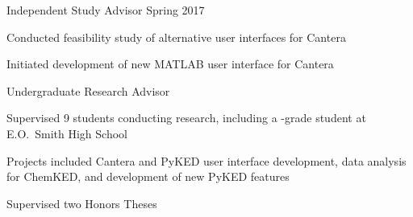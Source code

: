 \begin{outerlist}
    \item Independent Study Advisor \hfill Spring 2017
    \begin{innerlist}
        \item Conducted feasibility study of alternative user interfaces for Cantera
        \item Initiated development of new \textsc{MATLAB} user interface for Cantera
    \end{innerlist}

    \item Undergraduate Research Advisor
    \begin{innerlist}
        \item Supervised 9 students conducting research, including a -grade student at E.O.~Smith High School
        \item Projects included Cantera and PyKED user interface development, data analysis for ChemKED, and development of new PyKED features
        \item Supervised two Honors Theses
    \end{innerlist}

\end{outerlist}



